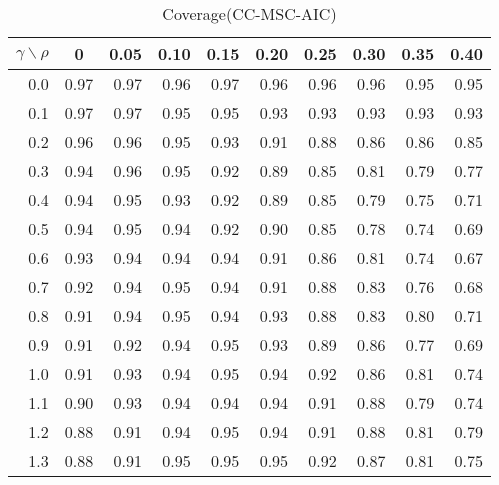 \documentclass[12pt]{article}
\begin{document}
%
\begin{table}[!tbp]
\caption{Coverage(CC-MSC-AIC)}
 \begin{center}
 \begin{tabular}{r|rrrrrrrrr}\hline\hline
\multicolumn{1}{c|}{$\gamma\backslash\rho$}&\multicolumn{1}{c}{0}&\multicolumn{1}{c}{0.05}&\multicolumn{1}{c}{0.10}&\multicolumn{1}{c}{0.15}&\multicolumn{1}{c}{0.20}&\multicolumn{1}{c}{0.25}&\multicolumn{1}{c}{0.30}&\multicolumn{1}{c}{0.35}&\multicolumn{1}{c}{0.40}\tabularnewline
\hline

0.0&0.97&0.97&0.96&0.97&0.96&0.96&0.96&0.95&0.95\tabularnewline
0.1&0.97&0.97&0.95&0.95&0.93&0.93&0.93&0.93&0.93\tabularnewline
0.2&0.96&0.96&0.95&0.93&0.91&0.88&0.86&0.86&0.85\tabularnewline
0.3&0.94&0.96&0.95&0.92&0.89&0.85&0.81&0.79&0.77\tabularnewline
0.4&0.94&0.95&0.93&0.92&0.89&0.85&0.79&0.75&0.71\tabularnewline
0.5&0.94&0.95&0.94&0.92&0.90&0.85&0.78&0.74&0.69\tabularnewline
0.6&0.93&0.94&0.94&0.94&0.91&0.86&0.81&0.74&0.67\tabularnewline
0.7&0.92&0.94&0.95&0.94&0.91&0.88&0.83&0.76&0.68\tabularnewline
0.8&0.91&0.94&0.95&0.94&0.93&0.88&0.83&0.80&0.71\tabularnewline
0.9&0.91&0.92&0.94&0.95&0.93&0.89&0.86&0.77&0.69\tabularnewline
1.0&0.91&0.93&0.94&0.95&0.94&0.92&0.86&0.81&0.74\tabularnewline
1.1&0.90&0.93&0.94&0.94&0.94&0.91&0.88&0.79&0.74\tabularnewline
1.2&0.88&0.91&0.94&0.95&0.94&0.91&0.88&0.81&0.79\tabularnewline
1.3&0.88&0.91&0.95&0.95&0.95&0.92&0.87&0.81&0.75\tabularnewline
\hline
\end{tabular}

\end{center}

\end{table}
\end{document}
